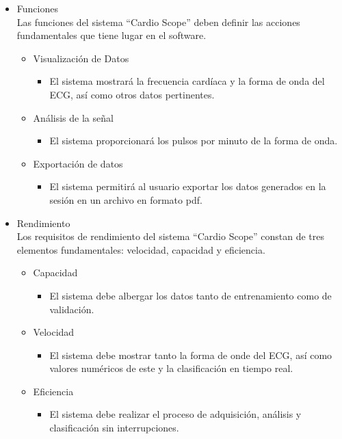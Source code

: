 \begin{itemize}
    \item Funciones\\
          Las funciones del sistema “Cardio Scope” deben definir las acciones fundamentales que tiene lugar en el software.
          \begin{itemize}
              \item Visualización de Datos
                    \begin{itemize}
                        \item El sistema mostrará la frecuencia cardíaca y la forma de onda del ECG, así
                              como otros datos pertinentes.
                    \end{itemize}
              \item Análisis de la señal
                    \begin{itemize}
                        \item El sistema proporcionará los pulsos por minuto de la forma de onda.
                    \end{itemize}
              \item Exportación de datos
                    \begin{itemize}
                        \item El sistema permitirá al usuario exportar los datos generados en la sesión en un
                              archivo en formato pdf.
                    \end{itemize}
          \end{itemize}
    \item Rendimiento\\
          Los requisitos de rendimiento del sistema “Cardio Scope” constan de tres elementos
          fundamentales: velocidad, capacidad y eficiencia.
          \begin{itemize}
              \item Capacidad
                    \begin{itemize}
                        \item El sistema debe albergar los datos tanto de entrenamiento como de validación.
                    \end{itemize}
              \item Velocidad
                    \begin{itemize}
                        \item El sistema debe mostrar tanto la forma de onde del ECG, así como valores
                              numéricos de este y la clasificación en tiempo real.
                    \end{itemize}
              \item Eficiencia
                    \begin{itemize}
                        \item El sistema debe realizar el proceso de adquisición, análisis y clasificación sin
                              interrupciones.
                    \end{itemize}
          \end{itemize}
\end{itemize}

